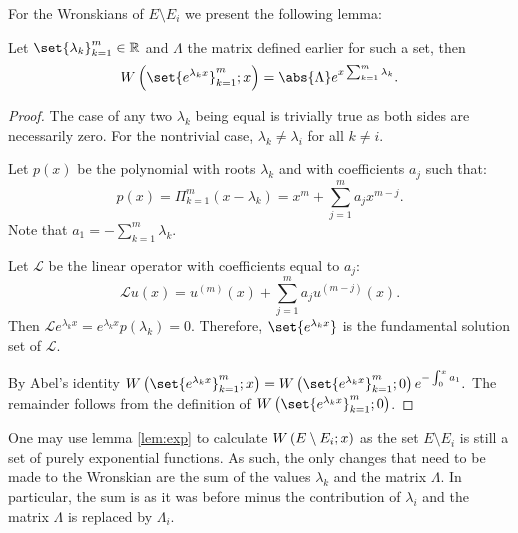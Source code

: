 \documentclass{article}
\begin{document}
For the Wronskians of $E \setminus E_i$ we present the following lemma:

\begin{lemma}
Let $\set{\lambda_k}_{k=1}^m \in \mathbb{R}$ and $\Lambda$ the matrix defined earlier for such a set, then
\begin{equation*}
\W{\set{e^{\lambda_k x}}_{k=1}^m}{x} = \abs{\Lambda}
e^{x \sum_{k=1}^m \lambda_k} .
\end{equation*}
\label{lem:exp}
\end{lemma}

\begin{proof}
The case of any two $\lambda_k$ being equal is trivially true as both sides are necessarily zero.
For the nontrivial case, $\lambda_k \neq \lambda_i$ for all $k \neq i$.

Let $p(x)$ be the polynomial with roots $\lambda_k$ and with coefficients $a_j$ such that:
\begin{equation*}
p(x) = \Pi_{k=1}^m \left (x - \lambda_k \right) = x^m + \sum_{j=1}^m a_j x^{m-j}.
\end{equation*}
Note that $a_1 = -\sum_{k=1}^m \lambda_k$.

Let $\mathcal{L}$ be the linear operator with coefficients equal to $a_j$:
$$
\mathcal{L} u(x) = u^{(m)}(x) + \sum_{j=1}^m a_j u^{(m-j)}(x).
$$
Then $\mathcal{L} e^{\lambda_k x} = e^{\lambda_k x} p(\lambda_k) = 0$.
Therefore, $\set{e^{\lambda_k x}}$ is the fundamental solution set of $\mathcal{L}$.

By Abel's identity $\W{\set{e^{\lambda_k x}}_{k=1}^m}{x} = \W{\set{e^{\lambda_k x}}_{k=1}^m}{0} e^{-\int_0^x a_1}.$
The remainder follows from the definition of $\W{\set{e^{\lambda_k x}}_{k=1}^m}{0}$.
\end{proof}

One may use lemma \ref{lem:exp} to calculate $W \left ( E \setminus E_i ; x \right )$ as the set $E \setminus E_i$ is still a set of purely exponential functions.
As such, the only changes that need to be made to the Wronskian are the sum of the values $\lambda_k$ and the matrix $\Lambda$.
In particular, the sum is as it was before minus the contribution of $\lambda_i$ and the matrix $\Lambda$ is replaced by $\Lambda_i$.
\end{document}
